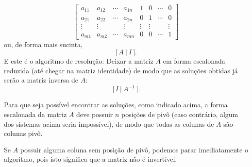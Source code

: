 \documentclass[../livro.tex]{subfiles}  %
\begin{document}
\begin{equation}
\left[
\begin{array}{cccc|cccc}
a_{11} & a_{12} & \cdots & a_{1n} &   1   &    0   & \cdots &    0 \\
a_{21} & a_{22} & \cdots & a_{2n} &   0   &    1   & \cdots &    0\\
\vdots & \vdots &        & \vdots &   \vdots & \vdots &        & \vdots  \\
a_{m1} & a_{m2} & \cdots & a_{mn} &   0   &    0   & \cdots &    1
\end{array}
\right]
\end{equation} ou, de forma mais sucinta,
\begin{equation}
\big[ \, A \ | \ I \ \big].
\end{equation} E este é o algoritmo de resolução: Deixar a matriz $A$ em forma escalonada reduzida (até chegar na matriz identidade) de modo que as soluções obtidas já serão a matriz inversa de $A$:
\begin{equation}
\big[ \, I \ | \ A^{-1} \ \big].
\end{equation}

\begin{remark}
	Para que seja possível encontrar as soluções, como indicado acima, a forma escalonada da matriz $A$ deve possuir $n$ posições de pivô (caso contrário, algum dos sistemas acima seria impossível), de modo que todas as colunas de $A$ são colunas pivô.
	
	Se $A$ possuir alguma coluna sem posição de pivô, podemos parar imediatamente o algoritmo, pois isto significa que a matriz não é invertível.
\end{remark}
\end{document}
